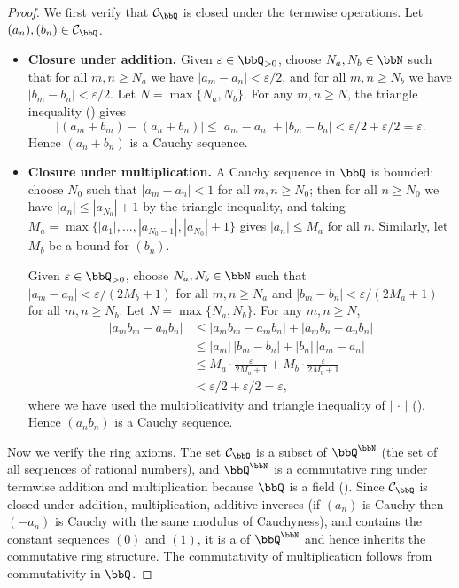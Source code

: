 \begin{proof}
    We first verify that $\mathcal{C}_\bbQ$ is closed under the termwise operations. Let $(a_n), (b_n) \in \mathcal{C}_\bbQ$.

    \begin{itemize}
        \item \textbf{Closure under addition.} Given $\varepsilon \in \bbQ_{>0}$, choose $N_a, N_b \in \bbN$ such that for all $m, n \ge N_a$ we have $|a_m - a_n| < \varepsilon/2$, and for all $m, n \ge N_b$ we have $|b_m - b_n| < \varepsilon/2$. Let $N = \max\{N_a, N_b\}$. For any $m, n \ge N$, the triangle inequality () gives
        $$|(a_m + b_m) - (a_n + b_n)| \le |a_m - a_n| + |b_m - b_n| < \varepsilon/2 + \varepsilon/2 = \varepsilon.$$
        Hence $(a_n + b_n)$ is a Cauchy sequence.

        \item \textbf{Closure under multiplication.} A Cauchy sequence in $\bbQ$ is bounded: choose $N_0$ such that $|a_m - a_n| < 1$ for all $m, n \ge N_0$; then for all $n \ge N_0$ we have $|a_n| \le |a_{N_0}| + 1$ by the triangle inequality, and taking $M_a = \max\{|a_1|, \dots, |a_{N_0-1}|, |a_{N_0}| + 1\}$ gives $|a_n| \le M_a$ for all $n$. Similarly, let $M_b$ be a bound for $(b_n)$.

        Given $\varepsilon \in \bbQ_{>0}$, choose $N_a, N_b \in \bbN$ such that $|a_m - a_n| < \varepsilon/(2M_b + 1)$ for all $m, n \ge N_a$ and $|b_m - b_n| < \varepsilon/(2M_a + 1)$ for all $m, n \ge N_b$. Let $N = \max\{N_a, N_b\}$. For any $m, n \ge N$,
        \begin{align*}
            |a_m b_m - a_n b_n|
            &\le |a_m b_m - a_m b_n| + |a_m b_n - a_n b_n| \\
            &\le |a_m|\,|b_m - b_n| + |b_n|\,|a_m - a_n| \\
            &\le M_a\cdot\frac{\varepsilon}{2M_a + 1} + M_b\cdot\frac{\varepsilon}{2M_b + 1} \\
            &< \varepsilon/2 + \varepsilon/2 = \varepsilon,
        \end{align*}
        where we have used the multiplicativity and triangle inequality of $|\,\cdot\,|$ (). Hence $(a_n b_n)$ is a Cauchy sequence.
    \end{itemize}

    Now we verify the ring axioms. The set $\mathcal{C}_\bbQ$ is a subset of $\bbQ^\bbN$ (the set of all sequences of rational numbers), and $\bbQ^\bbN$ is a commutative ring under termwise addition and multiplication because $\bbQ$ is a field (). Since $\mathcal{C}_\bbQ$ is closed under addition, multiplication, additive inverses (if $(a_n)$ is Cauchy then $(-a_n)$ is Cauchy with the same modulus of Cauchyness), and contains the constant sequences $(0)$ and $(1)$, it is a  of $\bbQ^\bbN$ and hence inherits the commutative ring structure. The commutativity of multiplication follows from commutativity in $\bbQ$.


\end{proof}
